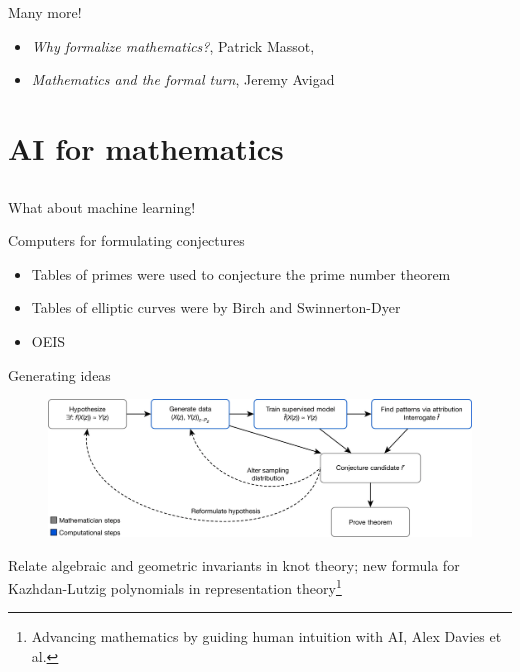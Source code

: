 \documentclass[usenames,dvipsnames,handout]{beamer}
\begin{document}
\begin{frame}{Many more!}
  \begin{itemize}[<+->]
    \item \emph{Why formalize mathematics?}, Patrick Massot,
    \item \emph{Mathematics and the formal turn}, Jeremy Avigad
  \end{itemize}
\end{frame}
\section{AI for mathematics}
\subsection{}
\begin{frame}
  What about machine learning!
\end{frame}
\begin{frame}{Computers for formulating conjectures}
  \begin{itemize}[<+->]
   \item Tables of primes were used to conjecture the prime number theorem
   \item Tables of elliptic curves were by Birch and Swinnerton-Dyer
   \item OEIS
  \end{itemize}
\end{frame}
\begin{frame}{Generating ideas}
    \begin{figure}
      \centering
      \includegraphics[width=\textwidth]{davies_flowchart.png}
    \end{figure}
    Relate algebraic and geometric invariants in knot theory; new formula for Kazhdan-Lutzig polynomials in representation theory\footnote{Advancing mathematics by guiding human intuition with AI, Alex Davies et al.}
\end{frame}
\end{document}
